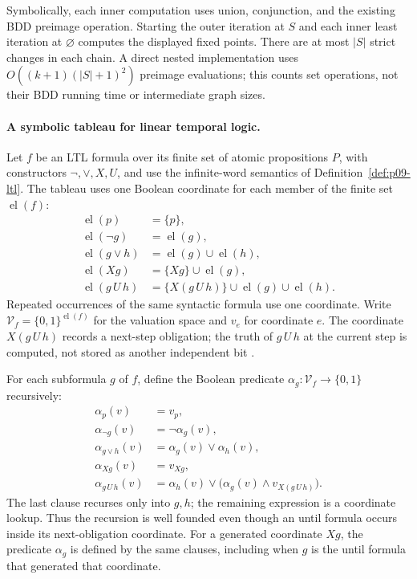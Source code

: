 Symbolically, each inner computation uses union, conjunction, and
the existing BDD preimage operation. Starting the outer iteration
at \(S\) and each inner least iteration at \(\varnothing\) computes
the displayed fixed points. There are at most \(|S|\) strict
changes in each chain. A direct nested implementation uses
\(O((k+1)(|S|+1)^2)\) preimage evaluations; this counts set
operations, not their BDD running time or intermediate graph sizes.

\paragraph{A symbolic tableau for linear temporal logic.}
Let \(f\) be an LTL formula over its finite set of atomic propositions
\(P\), with constructors \(\neg,\lor,X,U\), and use the infinite-word
semantics of Definition~\ref{def:p09-ltl}. The tableau uses one Boolean
coordinate for each member of the finite set \(\operatorname{el}(f)\):
\[
\begin{aligned}
 \operatorname{el}(p)&=\{p\},\\
 \operatorname{el}(\neg g)&=\operatorname{el}(g),\\
 \operatorname{el}(g\lor h)&=\operatorname{el}(g)\cup\operatorname{el}(h),\\
 \operatorname{el}(Xg)&=\{Xg\}\cup\operatorname{el}(g),\\
 \operatorname{el}(g\,U\,h)
   &=\{X(g\,U\,h)\}\cup\operatorname{el}(g)\cup\operatorname{el}(h).
\end{aligned}
\]
Repeated occurrences of the same syntactic formula use one coordinate.
Write \(\mathcal V_f=\{0,1\}^{\operatorname{el}(f)}\) for the
valuation space and \(v_e\) for coordinate \(e\).
The coordinate \(X(g\,U\,h)\) records a next-step obligation; the
truth of \(g\,U\,h\) at the current step is computed, not stored
as another independent bit \cite[\S7]{BurchEtAl1992}.

For each subformula \(g\) of \(f\), define the Boolean predicate
\(\alpha_g:\mathcal V_f\to\{0,1\}\) recursively:
\[
\begin{aligned}
 \alpha_p(v)&=v_p,\\
 \alpha_{\neg g}(v)&=\neg\alpha_g(v),\\
 \alpha_{g\lor h}(v)&=\alpha_g(v)\lor\alpha_h(v),\\
 \alpha_{Xg}(v)&=v_{Xg},\\
 \alpha_{g\,U\,h}(v)
   &=\alpha_h(v)\lor
           \bigl(\alpha_g(v)\land v_{X(g\,U\,h)}\bigr).
\end{aligned}
\]
The last clause recurses only into \(g,h\); the remaining expression
is a coordinate lookup. Thus the recursion is well founded even
though an until formula occurs inside its next-obligation coordinate.
For a generated coordinate \(Xg\), the predicate \(\alpha_g\)
is defined by the same clauses, including when \(g\) is the until
formula that generated that coordinate.

